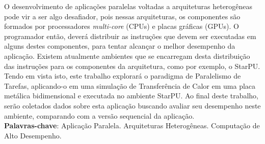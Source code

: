 
\begin{resumo}[RESUMO]
\begin{SingleSpacing}


O desenvolvimento de aplicações paralelas voltadas a arquiteturas heterogêneas pode vir a ser algo desafiador, pois nessas arquiteturas, os componentes são formados por processadores \emph{multi-core} (CPUs) e placas gráficas (GPUs).
O programador então, deverá distribuir as instruções que devem ser executadas em alguns destes componentes, para tentar alcançar o melhor desempenho da aplicação.
Existem atualmente ambientes que se encarregam desta distribuição das instruções para os componentes da arquitetura, como por exemplo, o StarPU. 
Tendo em vista isto, este trabalho explorará o paradigma de Paralelismo de Tarefas, aplicando-o em uma simulação de Transferência de Calor em uma placa metálica bidimensional e executada no ambiente StarPU.
Ao final deste trabalho, serão coletados dados sobre esta aplicação buscando avaliar seu desempenho neste ambiente, comparando com a versão sequencial da aplicação.\\

\textbf{Palavras-chave}: Aplicação Paralela. Arquiteturas Heterogêneas. Computação de Alto Desempenho.

\end{SingleSpacing}
\end{resumo}